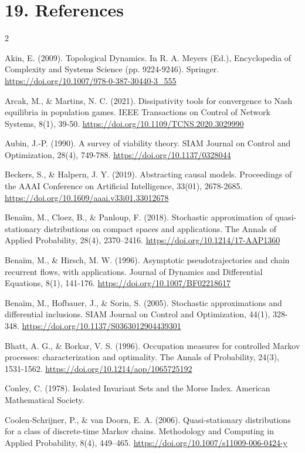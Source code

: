 \documentclass[10pt]{article}
\begin{document}
\section{19. References}\label{references}
\begingroup\footnotesize\setlength{\parskip}{1.5pt plus .3pt minus .2pt}\begin{multicols}{2}\raggedcolumns

Akin, E. (2009). Topological Dynamics. In R. A. Meyers (Ed.),
Encyclopedia of Complexity and Systems Science (pp. 9224-9246).
Springer. \url{https://doi.org/10.1007/978-0-387-30440-3\_555}

Arcak, M., \& Martins, N. C. (2021). Dissipativity tools for convergence
to Nash equilibria in population games. IEEE Transactions on Control of
Network Systems, 8(1), 39-50. \url{https://doi.org/10.1109/TCNS.2020.3029990}

Aubin, J.-P. (1990). A survey of viability theory. SIAM Journal on
Control and Optimization, 28(4), 749-788.
\url{https://doi.org/10.1137/0328044}

Beckers, S., \& Halpern, J. Y. (2019). Abstracting causal models.
Proceedings of the AAAI Conference on Artificial Intelligence, 33(01),
2678-2685. \url{https://doi.org/10.1609/aaai.v33i01.33012678}

Bena\"im, M., Cloez, B., \& Panloup, F. (2018). Stochastic approximation of quasi-stationary distributions on compact spaces and applications. The Annals of Applied Probability, 28(4), 2370--2416. \url{https://doi.org/10.1214/17-AAP1360}

Benaïm, M., \& Hirsch, M. W. (1996). Asymptotic pseudotrajectories and
chain recurrent flows, with applications. Journal of Dynamics and
Differential Equations, 8(1), 141-176.
\url{https://doi.org/10.1007/BF02218617}

Benaïm, M., Hofbauer, J., \& Sorin, S. (2005). Stochastic approximations
and differential inclusions. SIAM Journal on Control and Optimization,
44(1), 328-348. \url{https://doi.org/10.1137/S0363012904439301}

Bhatt, A. G., \& Borkar, V. S. (1996). Occupation measures for
controlled Markov processes: characterization and optimality. The Annals
of Probability, 24(3), 1531-1562. \url{https://doi.org/10.1214/aop/1065725192}

Conley, C. (1978). Isolated Invariant Sets and the Morse Index. American
Mathematical Society.

Coolen-Schrijner, P., \& van Doorn, E. A. (2006). Quasi-stationary distributions for a class of discrete-time Markov chains. Methodology and Computing in Applied Probability, 8(4), 449--465. \url{https://doi.org/10.1007/s11009-006-0424-y}


\end{multicols}
\end{document}
